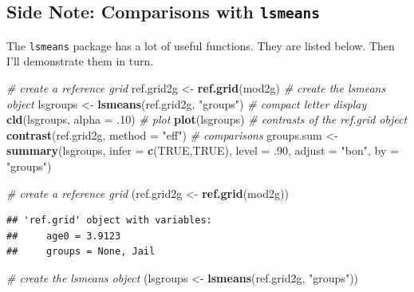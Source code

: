\documentclass[]{article}
\newenvironment{Shaded}{\begin{snugshade}}{\end{snugshade}}
\newcommand{\KeywordTok}[1]{\textcolor[rgb]{0.13,0.29,0.53}{\textbf{{#1}}}}
\newcommand{\DataTypeTok}[1]{\textcolor[rgb]{0.13,0.29,0.53}{{#1}}}
\newcommand{\DecValTok}[1]{\textcolor[rgb]{0.00,0.00,0.81}{{#1}}}
\newcommand{\StringTok}[1]{\textcolor[rgb]{0.31,0.60,0.02}{{#1}}}
\newcommand{\CommentTok}[1]{\textcolor[rgb]{0.56,0.35,0.01}{\textit{{#1}}}}
\newcommand{\OtherTok}[1]{\textcolor[rgb]{0.56,0.35,0.01}{{#1}}}
\newcommand{\NormalTok}[1]{{#1}}
\begin{document}
\normalsize  

\subsection{\texorpdfstring{Side Note: Comparisons with
\texttt{lsmeans}}{Side Note: Comparisons with lsmeans}}\label{side-note-comparisons-with-lsmeans}

The \texttt{lsmeans} package has a lot of useful functions. They are
listed below. Then I'll demonstrate them in turn.\\
\small

\begin{Shaded}
\begin{Highlighting}[]
\CommentTok{# create a reference grid}
\NormalTok{ref.grid2g <-}\StringTok{ }\KeywordTok{ref.grid}\NormalTok{(mod2g)}
\CommentTok{# create the lsmeans object}
\NormalTok{lsgroups   <-}\StringTok{ }\KeywordTok{lsmeans}\NormalTok{(ref.grid2g, }\StringTok{"groups"}\NormalTok{)}
\CommentTok{# compact letter display}
\KeywordTok{cld}\NormalTok{(lsgroups, }\DataTypeTok{alpha =} \NormalTok{.}\DecValTok{10}\NormalTok{)}
\CommentTok{# plot}
\KeywordTok{plot}\NormalTok{(lsgroups)}
\CommentTok{# contrasts of the ref.grid object}
\KeywordTok{contrast}\NormalTok{(ref.grid2g, }\DataTypeTok{method =} \StringTok{"eff"}\NormalTok{)}
\CommentTok{# comparisons}
\NormalTok{groups.sum <-}\StringTok{ }\KeywordTok{summary}\NormalTok{(lsgroups, }\DataTypeTok{infer =} \KeywordTok{c}\NormalTok{(}\OtherTok{TRUE}\NormalTok{,}\OtherTok{TRUE}\NormalTok{), }
                      \DataTypeTok{level =} \NormalTok{.}\DecValTok{90}\NormalTok{, }\DataTypeTok{adjust =} \StringTok{"bon"}\NormalTok{, }\DataTypeTok{by =} \StringTok{"groups"}\NormalTok{)}
\end{Highlighting}
\end{Shaded}

\begin{Shaded}
\begin{Highlighting}[]
\CommentTok{# create a reference grid}
\NormalTok{(ref.grid2g <-}\StringTok{ }\KeywordTok{ref.grid}\NormalTok{(mod2g))}
\end{Highlighting}
\end{Shaded}

\begin{verbatim}
## 'ref.grid' object with variables:
##     age0 = 3.9123
##     groups = None, Jail
\end{verbatim}

\begin{Shaded}
\begin{Highlighting}[]
\CommentTok{# create the lsmeans object}
\NormalTok{(lsgroups   <-}\StringTok{ }\KeywordTok{lsmeans}\NormalTok{(ref.grid2g, }\StringTok{"groups"}\NormalTok{))}
\end{Highlighting}
\end{Shaded}
\end{document}
